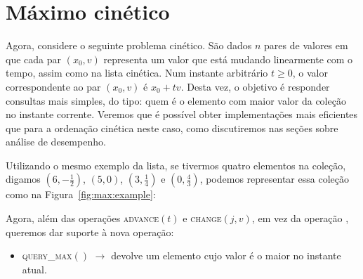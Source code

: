 

\chapter{Máximo cinético}\label{ch:maximo-cinetico}
Agora, considere o seguinte problema cinético.
São dados $n$ pares de valores em que cada par $(x_0, v)$ representa um valor que está mudando
linearmente com o tempo, assim como na lista cinética.
Num instante arbitrário $t \geq 0$, o valor correspondente ao par $(x_0, v)$ é $x_0 + tv$.
Desta vez, o objetivo é responder consultas mais simples, do tipo: quem é o elemento com maior
valor da coleção no instante corrente.
Veremos que é possível obter implementações mais eficientes que para a ordenação cinética neste
caso, como discutiremos nas seções sobre análise de desempenho.

Utilizando o mesmo exemplo da lista, se tivermos quatro elementos na coleção,
digamos $\left(6, -\frac{1}{2}\right)$, $(5, 0)$, $\left(3,
\frac{1}{4}\right)$ e $\left(0, \frac{4}{3}\right)$, podemos representar essa
coleção como na Figura~\ref{fig:max:example}:



Agora, além das operações \textsc{advance}$(t)$ e \textsc{change}$(j, v)$, em
vez da operação , queremos dar suporte à nova operação:
\begin{itemize}
    \item \textsc{query\_max}$()$ $\rightarrow$ devolve um elemento cujo valor é
    o maior no instante atual.
\end{itemize}


